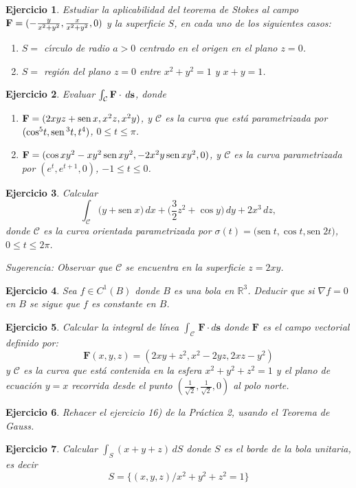 \documentclass[11pt,a4paper,pdftex]{amsart}
\newtheorem{ej}{Ejercicio}%
\newcommand{\bej}[1]{\begin{ej}\rm{#1}}
\newcommand{\eej}{\end{ej}\vspace{-0.2cm}}
\newcommand{\mc}[1]{\mathcal{#1}}
\renewcommand{\bf}{\textbf}
\newcommand{\C}{{\mathcal C}}
\newcommand{\R}{\mathbb R}
\newcommand{\0}{\mathbb O}
\newcommand{\8}{\infty}
\newcommand{\sen}[1]{\mbox{sen}\;{#1}}
\begin{document}
\bej  Estudiar la aplicabilidad del teorema de Stokes al campo ${\bf F}%
=(-\frac y{x^2+y^2},\frac x{x^2+y^2},0)$ y la superficie $S$, en cada uno de los siguientes casos:

\begin{enumerate}
\item[a).]  $S=$ c\'{\i }rculo de radio $a>0$ centrado en el origen en el plano $z=0$.

\item[b).]  $S=$ regi\'{o}n del plano $z=0$ entre $x^2+y^2=1$ y $x+y=1$.
\end{enumerate}
\eej


\bej  Evaluar $\int_\C{\bf F}\cdot \,d{\bf s}$, donde

\begin{enumerate}
\item[a).]  ${\bf F}=(2xyz+\mbox{sen\,} x,x^2z,x^2y)$, y $\C$ es la curva que est\'{a}
parametrizada por $({\cos }^5t,{\mbox{sen\,} }^3t,t^4)$, $0\le t\le \pi $.

\item[b).]  ${\bf F}=(\cos xy^2-xy^2\,\mbox{sen\,} xy^2,-2x^2y\,\mbox{sen\,} xy^2,0)$, y $\C$ es
la curva parametrizada
por $(e^t,e^{t+1},0)$, $-1\le t\le 0$.
\end{enumerate}
\eej

\bej Calcular
$$
\int_\C \big(y+\sen x\big)\,dx+\Big(\frac32 z^2+\cos y\Big)\,dy+2x^3\,dz,
$$
donde $\C$ es la curva orientada parametrizada por $\sigma(t)=\big(\sen t,\cos t,\sen 2t\big)$,
$0\le t\le 2\pi$.

Sugerencia: Observar que $\C$ se encuentra en la superficie $z=2xy$.
\eej



\bej Sea $f\in C^1(B)$ donde $B$ es una bola en $\R^3$. Deducir que si $\nabla f=0$
en $B$ se sigue que $f$ es constante en $B$.
\eej

\bej Calcular la integral de
línea $\int_{\mc C}\,\textbf{F}\cdot d\textbf{s}$ donde $\textbf{F}$ es el campo vectorial
definido por: 
$$
\textbf{F}(x,y,z)=(2xy+z^2,x^2-2yz,2xz-y^2)
$$
y ${\mc C}$ es la curva que está contenida en la esfera $x^2+y^2+z^2=1$ 
y el plano de ecuación $y=x$ recorrida desde el punto $\left( \frac{1}{\sqrt{2}}, \frac{1}{\sqrt{2}}, 0 \right)$ 
al polo norte.
\eej



\bej Rehacer el ejercicio 16) de la Pr\'{a}ctica 2, usando el
Teorema de Gauss.
\eej

\bej  Calcular $\int_S(x+y+z)\,dS$ donde $S$ es el borde de la bola unitaria,
es decir
\[
S=\{(x,y,z)/x^2+y^2+z^2=1\}
\]
\eej
\end{document}
